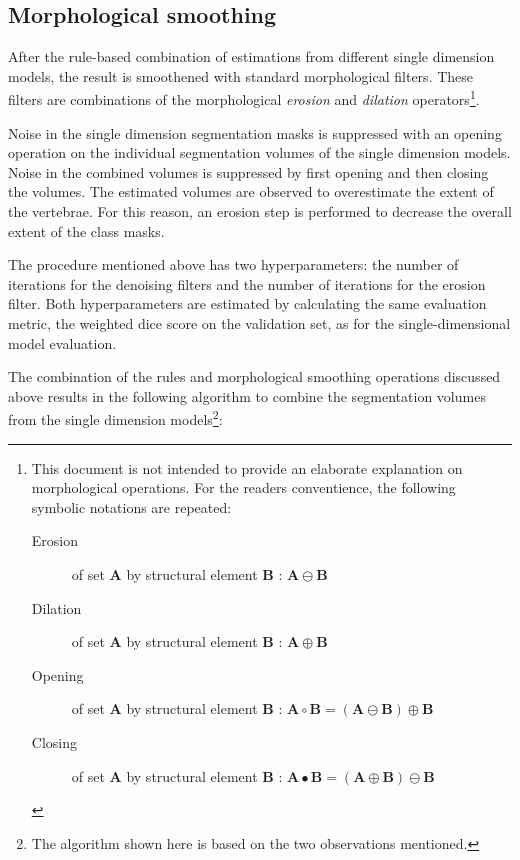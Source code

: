 \subsection{Morphological smoothing}
After the rule-based combination of estimations from different single dimension models, the result is smoothened with standard morphological filters.
These filters are combinations of the morphological \textit{erosion} and \textit{dilation} operators\footnote{
    This document is not intended to provide an elaborate explanation on morphological operations.
    For the readers conventience, the following symbolic notations are repeated:
    \begin{description}
        \item[Erosion] of set $\mathbf{A}$ by structural element $\mathbf{B}$ : $\mathbf{A} \ominus \mathbf{B}$ 
        \item[Dilation] of set $\mathbf{A}$ by structural element $\mathbf{B}$ : $\mathbf{A} \oplus \mathbf{B}$ 
        \item[Opening] of set $\mathbf{A}$ by structural element $\mathbf{B}$ : $\mathbf{A} \circ \mathbf{B} = (\mathbf{A} \ominus \mathbf{B}) \oplus \mathbf{B}$
        \item[Closing] of set $\mathbf{A}$ by structural element $\mathbf{B}$ : $\mathbf{A} \bullet \mathbf{B} = (\mathbf{A} \oplus \mathbf{B}) \ominus \mathbf{B}$
    \end{description}
}.
\par{
    Noise in the single dimension segmentation masks is suppressed with an opening operation on the individual segmentation volumes of the single dimension models.
    Noise in the combined volumes is suppressed by first opening and then closing the volumes.
    The estimated volumes are observed to overestimate the extent of the vertebrae. For this reason, an erosion step is performed to decrease the overall extent of the class masks.
}
\par{
    The procedure mentioned above has two hyperparameters: the number of iterations for the denoising filters and the number of iterations for the erosion filter.
    Both hyperparameters are estimated by calculating the same evaluation metric, the weighted dice score on the validation set, as for the single-dimensional model evaluation. 
    
    The combination of the rules and morphological smoothing operations discussed above results in the following algorithm to combine the segmentation volumes from the single dimension models\footnote{
        The algorithm shown here is based on the two observations mentioned.
    }:
}
